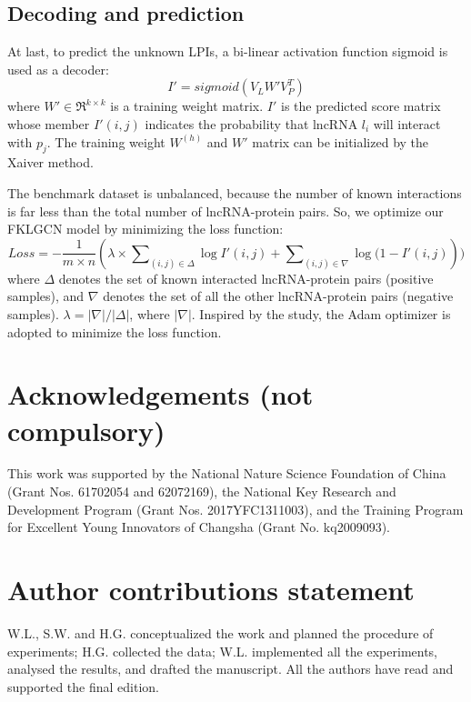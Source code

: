 \documentclass[fleqn,10pt]{wlscirep}
\begin{document}
\subsection*{Decoding and prediction}
At last, to predict the unknown LPIs, a bi-linear activation function sigmoid is used as a decoder:
\begin{equation} \label{eq:decoder}
I' = sigmoid({V_L}W'V_P^T)
\end{equation}
where $W' \in {\Re ^{k \times k}}$ is a training weight matrix. $I'$ is the predicted score matrix whose member $I'(i,j)$ indicates the probability that lncRNA $l_i$ will interact with $p_j$. The training weight ${W^{(h)}}$ and $W'$ matrix can be initialized by the Xaiver method\cite{Glorot2010UnderstandingNetworks}.

The benchmark dataset is unbalanced, because the number of known interactions is far less than the total number of lncRNA-protein pairs. So, we optimize our FKLGCN model by minimizing the loss function:
\begin{equation} \label{eq:LOSSr}
Loss =  - \frac{1}{{m \times n}}(\lambda  \times \sum\nolimits_{(i,j) \in \Delta } {\log I'(i,j)}  + \sum\nolimits_{(i,j) \in \nabla } {\log (1 - I'(i,j)} ))
\end{equation}
where $\Delta $ denotes the set of known interacted lncRNA-protein pairs (positive samples), and $\nabla $ denotes the set of all the other lncRNA-protein pairs (negative samples). $\lambda  = \left| \nabla  \right|/\left| \Delta  \right|$, where $\left| \nabla  \right|$. Inspired by the study\cite{Yu2020c}, the Adam optimizer is adopted to minimize the loss function\cite{Kingma2015Adam:Optimization}.


\section*{Acknowledgements (not compulsory)}
This work was supported by the National Nature Science Foundation of China (Grant Nos. 61702054 and 62072169), the National Key Research and Development Program (Grant Nos. 2017YFC1311003), and the Training Program for Excellent Young Innovators of Changsha (Grant No. kq2009093).
\section*{Author contributions statement}
W.L., S.W. and H.G. conceptualized the work and planned the procedure of experiments; H.G. collected the data; W.L. implemented all the experiments, analysed the results, and drafted the manuscript. All the authors have read and supported the final edition. 
\end{document}
